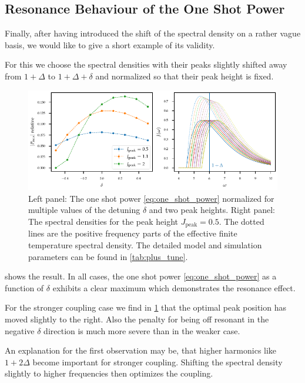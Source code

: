 \subsection{Resonance Behaviour of the One Shot Power}
\label{sec:modcoup_reso}

Finally, after having introduced the shift of the spectral density on
a rather vague basis, we would like to give a short example of its
validity.

For this we choose the spectral densities with their peaks slightly
shifted away from \(1+Δ\) to \(1+Δ+δ\) and normalized so that their
peak height is fixed.
\begin{figure}[htb]
  \centering
  \includegraphics{figs/one_bath_mod/modulation_tuning}
  \caption{\label{fig:modulation_tuning} Left panel: The one shot
    power \cref{eq:one_shot_power} normalized for multiple values of
    the detuning \(δ\) and two peak heights. Right panel: The spectral
    densities for the peak height \(J_{\mathrm{peak}} = 0.5\). The
    dotted lines are the positive frequency parts of the effective
    finite temperature spectral density. The detailed model and
    simulation parameters can be found in \cref{tab:plus_tune}.}
\end{figure}

 shows the result. In all cases, the one
shot power \cref{eq:one_shot_power} as a function of \(δ\) exhibits a
clear maximum which demonstrates the resonance effect.

For the stronger coupling case we find in \cref{fig:modulation_tuning}
that the optimal peak position has moved slightly to the right.
Also the penalty for being off resonant in the negative \(δ\)
direction is much more severe than in the weaker case.

An explanation for the first observation may be, that higher harmonics
like \(1+ 2 Δ\) become important for stronger coupling. Shifting the
spectral density slightly to higher frequencies then optimizes the
coupling.



